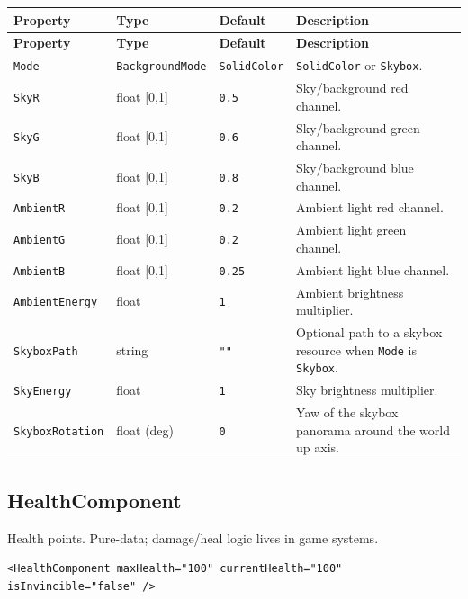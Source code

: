\documentclass[11pt,a4paper]{article}
\begin{document}
\begin{longtable}{P{3.5cm} P{2.2cm} P{2.2cm} P{5.1cm}}
  \toprule
  \textbf{Property} & \textbf{Type} & \textbf{Default} & \textbf{Description} \\
  \midrule
  \endfirsthead
  \toprule
  \textbf{Property} & \textbf{Type} & \textbf{Default} & \textbf{Description} \\
  \midrule
  \endhead
  \texttt{Mode} & \texttt{BackgroundMode} & \texttt{SolidColor} &
    \texttt{SolidColor} or \texttt{Skybox}. \\
  \texttt{SkyR} & float [0,1] & \texttt{0.5} & Sky/background red channel. \\
  \texttt{SkyG} & float [0,1] & \texttt{0.6} & Sky/background green channel. \\
  \texttt{SkyB} & float [0,1] & \texttt{0.8} & Sky/background blue channel. \\
  \texttt{AmbientR} & float [0,1] & \texttt{0.2} & Ambient light red channel. \\
  \texttt{AmbientG} & float [0,1] & \texttt{0.2} & Ambient light green channel. \\
  \texttt{AmbientB} & float [0,1] & \texttt{0.25} & Ambient light blue channel. \\
  \texttt{AmbientEnergy} & float & \texttt{1} & Ambient brightness multiplier. \\
  \texttt{SkyboxPath} & string & \texttt{""} &
    Optional path to a skybox resource when \texttt{Mode} is \texttt{Skybox}. \\
  \texttt{SkyEnergy} & float & \texttt{1} & Sky brightness multiplier. \\
  \texttt{SkyboxRotation} & float (deg) & \texttt{0} &
    Yaw of the skybox panorama around the world up axis. \\
  \bottomrule
\end{longtable}

\subsection{HealthComponent}

Health points. Pure-data; damage/heal logic lives in game systems.

\begin{lstlisting}
<HealthComponent maxHealth="100" currentHealth="100" isInvincible="false" />
\end{lstlisting}
\end{document}
